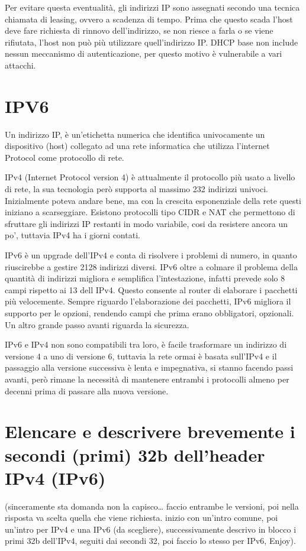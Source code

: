 Per evitare questa eventualità, gli indirizzi IP sono assegnati secondo una tecnica chiamata di leasing, ovvero a scadenza di tempo. Prima che questo scada l’host deve fare richiesta di rinnovo dell’indirizzo, se non riesce a farla o se viene rifiutata, l’host non può più utilizzare quell’indirizzo IP.
DHCP base non include nessun meccanismo di autenticazione, per questo motivo è vulnerabile a vari attacchi.

\section{IPV6}

Un indirizzo IP, è un’etichetta numerica che identifica univocamente un dispositivo (host) collegato ad una rete informatica che utilizza l’internet Protocol come protocollo di rete.

IPv4 (Internet Protocol version 4) è attualmente il protocollo più usato a livello di rete, la sua tecnologia però supporta al massimo 232 indirizzi univoci.
Inizialmente poteva andare bene, ma con la crescita esponenziale della rete questi iniziano a scarseggiare. Esistono protocolli tipo CIDR e NAT che permettono di sfruttare gli indirizzi IP restanti in modo variabile, cosi da resistere ancora un po’, tuttavia IPv4 ha i giorni contati.

IPv6 è un upgrade dell’IPv4 e conta di risolvere i problemi di numero, in quanto riuscirebbe a gestire 2128 indirizzi diversi.
IPv6 oltre a colmare il problema della quantità di indirizzi migliora e semplifica l’intestazione, infatti prevede solo 8 campi rispetto ai 13 dell IPv4. Questo consente al router di elaborare i pacchetti più velocemente. Sempre riguardo l’elaborazione dei pacchetti, IPv6 migliora il supporto per le opzioni, rendendo campi che prima erano obbligatori, opzionali. Un altro grande passo avanti riguarda la sicurezza.

IPv6 e IPv4 non sono compatibili tra loro, è facile trasformare un indirizzo di versione 4 a uno di versione 6, tuttavia la rete ormai è basata sull’IPv4 e il passaggio alla versione successiva è lenta e impegnativa, si stanno facendo passi avanti, però rimane la necessità di mantenere entrambi i protocolli almeno per decenni prima di passare alla nuova versione.

\section{Elencare e descrivere brevemente i secondi (primi) 32b dell'header IPv4 (IPv6)}
(sinceramente sta domanda non la capisco… faccio entrambe le versioni, poi nella risposta va scelta quella che viene richiesta. inizio con un’intro comune, poi un’intro per IPv4 e una IPv6 (da scegliere), successivamente descrivo in blocco i primi 32b dell’IPv4, seguiti dai secondi 32, poi faccio lo stesso per IPv6, Enjoy).\\


